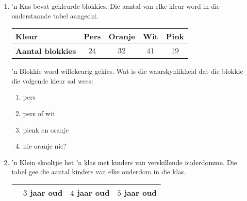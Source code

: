 \begin{exercises}{}
{
  \begin{enumerate}[itemsep=3pt, label=\textbf{\arabic*}.]
  \item  'n Kas bevat gekleurde blokkies. Die aantal van elke kleur word in die onderstaande tabel aangedui.

  \begin{center}
      \begin{tabular}{|l|c|c|c|c|}
        \hline
        \textbf{Kleur} & Pers & Oranje & Wit & Pink \\ \hline
       
        \textbf{Aantal blokkies} & $24$ & $32$ & $41$ & $19$ \\ \hline
   
      \end{tabular}
    \end{center}
    'n Blokkie word willekeurig gekies. Wat is die waarskynlikheid dat die blokkie die volgende kleur sal wees:
    \begin{enumerate}[noitemsep, label=\textbf{(\alph*)} ]
    \item pers
    \item pers of wit
    \item pienk en oranje
    \item nie oranje nie?
    \end{enumerate}

  \item 'n Klein skooltjie het 'n klas met kinders van verskillende ouderdomme. Die tabel gee die aantal kinders van elke ouderdom in die klas.

    \begin{center}
      \begin{tabular}{|l|c|c|c|}
        \hline
               & $3$ jaar oud & $4$ jaar oud & $5$ jaar oud \\\hline
   

\end{tabular}
\end{center}
\end{enumerate}}
\end{exercises}

